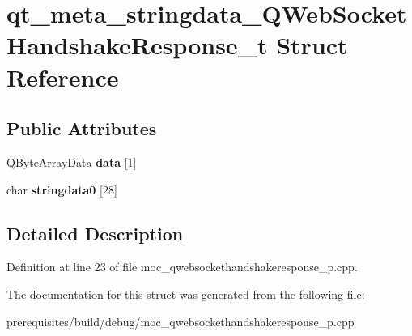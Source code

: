 \hypertarget{structqt__meta__stringdata___q_web_socket_handshake_response__t}{}\section{qt\+\_\+meta\+\_\+stringdata\+\_\+\+Q\+Web\+Socket\+Handshake\+Response\+\_\+t Struct Reference}
\label{structqt__meta__stringdata___q_web_socket_handshake_response__t}
\subsection*{Public Attributes}
\begin{DoxyCompactItemize}
\item 
\mbox{\label{structqt__meta__stringdata___q_web_socket_handshake_response__t_a3d3cf7fb152e28b348f753d82d73e6c4}} 
Q\+Byte\+Array\+Data {\bfseries data} \mbox{[}1\mbox{]}
\item 
\mbox{\label{structqt__meta__stringdata___q_web_socket_handshake_response__t_a7b4a976912c032beb4da25b71537d98e}} 
char {\bfseries stringdata0} \mbox{[}28\mbox{]}
\end{DoxyCompactItemize}


\subsection{Detailed Description}


Definition at line 23 of file moc\+\_\+qwebsockethandshakeresponse\+\_\+p.\+cpp.



The documentation for this struct was generated from the following file\+:\begin{DoxyCompactItemize}
\item 
prerequisites/build/debug/moc\+\_\+qwebsockethandshakeresponse\+\_\+p.\+cpp\end{DoxyCompactItemize}
